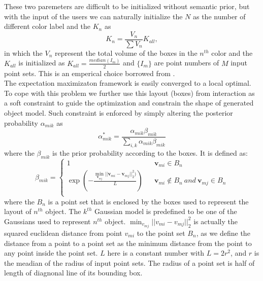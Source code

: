 These two paremeters  are difficult to be initialized without semantic prior, but with the input of the users we can naturally initialize the $N$ as the number of different color label and the ${K_n}$ as 
\begin{equation}
\label{equ:K_n}
K_n=\frac{V_n}{\sum V_n}K_{all},
\end{equation}
in which the $V_n$ represent the total volume of the boxes in the $n^{th}$ color and the $K_{all}$ is initialized as $K_{all}=\frac{median(I_m)}{2}$ and $\{I_m\}$ are point numbers of $M$ input point sets. This is an emperical  choice borrowed from \cite{Evangelidis2014}.\\
%
The expectation maximizaton  framework is easily converged to a local optimal. To cope with this problem we further use this layout (boxes) from interaction as a soft constraint to guide the optimization and constrain the shape of generated object model. Such constraint is enforced by simply altering the posterior probability $\alpha_{mik}$ as
%
\begin{equation}
\label{equ:alteralpha}
\alpha_{mik}^*=\frac{\alpha_{mik}\beta_{mik}}{\sum_{i,k}\alpha_{mik}\beta_{mik}}
\end{equation}
where the $\beta_{mik}$ is the prior probability according to the boxes. It is defined as:
\begin{equation}
\beta_{mik}=\left\{
\begin{array}{rcl}
1& &\pmb v_{mi} \in B_n\\
\exp(-\frac{\min_{\pmb v_{mj}}|| \pmb v_{mi} - \pmb v_{mj} ||_2^2  )}{L})& &\pmb v_{mi} \notin B_n~and~\pmb v_{mj} \in B_n\\
\end{array} \right.
\end{equation}
where the $B_n$ is a point set that is enclosed by the boxes used to represent the layout of $n^{th}$ object. The $k^{th}$ Gaussian model is predefined to be one of the Gaussians used to represent $n^{th}$ object. $\min_{v_{mj}}|| v_{mi} - v_{mj} ||_2^2$ is actually the squared euclidean distance from point $v_{mi}$ to the point set $B_n$, as we define the distance from a point to a point set as the minimum distance from the point to any point inside the point set. $L$ here is a constant number with $L=2r^2$, and $r$ is the meadian  of the radius of input point sets. The radius of a point set is half of length of diagnonal  line of its  bounding box.   
